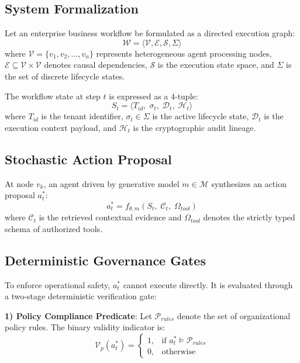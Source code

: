 \documentclass[conference]{IEEEtran}
\begin{document}
\subsection{System Formalization}
Let an enterprise business workflow be formulated as a directed execution graph:
\begin{equation}
\mathcal{W} = \langle \mathcal{V}, \mathcal{E}, \mathcal{S}, \Sigma \rangle
\end{equation}
where $\mathcal{V} = \{v_1, v_2, \dots, v_n\}$ represents heterogeneous agent processing nodes, $\mathcal{E} \subseteq \mathcal{V} \times \mathcal{V}$ denotes causal dependencies, $\mathcal{S}$ is the execution state space, and $\Sigma$ is the set of discrete lifecycle states.

The workflow state at step $t$ is expressed as a 4-tuple:
\begin{equation}
S_t = \langle T_{id},\; \sigma_t,\; \mathcal{D}_t,\; \mathcal{H}_t \rangle
\end{equation}
where $T_{id}$ is the tenant identifier, $\sigma_t \in \Sigma$ is the active lifecycle state, $\mathcal{D}_t$ is the execution context payload, and $\mathcal{H}_t$ is the cryptographic audit lineage.

\subsection{Stochastic Action Proposal}
At node $v_k$, an agent driven by generative model $m \in \mathcal{M}$ synthesizes an action proposal $a_t^*$:
\begin{equation}
a_t^* = f_{\theta, m}\left(S_t,\; \mathcal{C}_t,\; \Omega_{tool}\right)
\end{equation}
where $\mathcal{C}_t$ is the retrieved contextual evidence and $\Omega_{tool}$ denotes the strictly typed schema of authorized tools.

\subsection{Deterministic Governance Gates}
To enforce operational safety, $a_t^*$ cannot execute directly. It is evaluated through a two-stage deterministic verification gate:

\textbf{1) Policy Compliance Predicate}: Let $\mathcal{P}_{rules}$ denote the set of organizational policy rules. The binary validity indicator is:
\begin{equation}
\mathcal{V}_{p}(a_t^*) = 
\begin{cases}
1, & \text{if } a_t^* \models \mathcal{P}_{rules} \\
0, & \text{otherwise}
\end{cases}
\end{equation}
\end{document}
